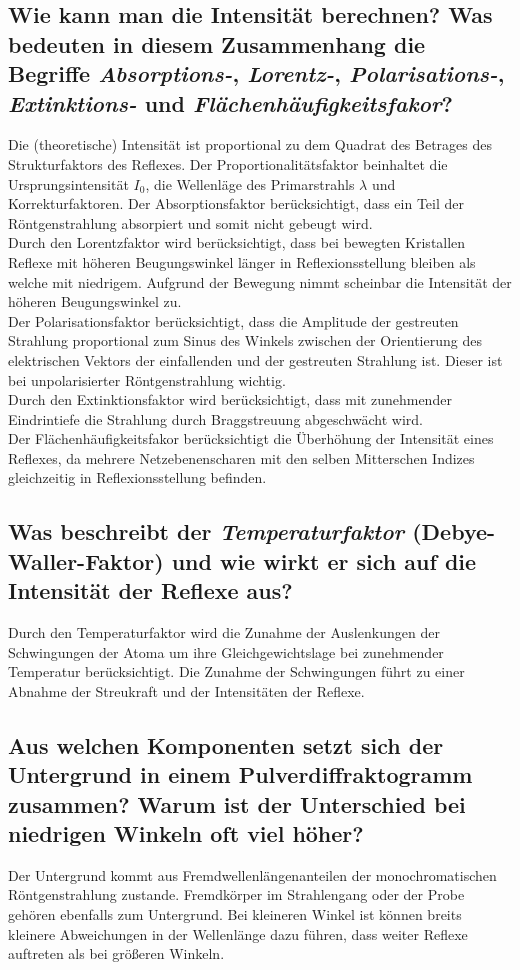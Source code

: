 \subsection*{Wie kann man die Intensität berechnen? Was bedeuten in diesem Zusammenhang die Begriffe \textit{Absorptions-}, \textit{Lorentz-}, \textit{Polarisations-}, \textit{Extinktions-} und \textit{Flächenhäufigkeitsfakor}?}
Die (theoretische) Intensität ist proportional zu dem Quadrat des Betrages des Strukturfaktors des Reflexes.
Der Proportionalitätsfaktor beinhaltet die Ursprungsintensität $I_0$, die Wellenläge des Primarstrahls $\lambda$ und Korrekturfaktoren. \cite{Kleber}
Der Absorptionsfaktor berücksichtigt, dass ein Teil der Röntgenstrahlung absorpiert und somit nicht gebeugt wird.\\
Durch den Lorentzfaktor wird berücksichtigt, dass bei bewegten Kristallen Reflexe mit höheren Beugungswinkel länger in Reflexionsstellung bleiben als welche mit niedrigem.
Aufgrund der Bewegung nimmt scheinbar die Intensität der höheren Beugungswinkel zu.\\
Der Polarisationsfaktor berücksichtigt, dass die Amplitude der gestreuten Strahlung proportional zum Sinus des Winkels zwischen der Orientierung des elektrischen Vektors der einfallenden und der gestreuten Strahlung ist.
Dieser ist bei unpolarisierter Röntgenstrahlung wichtig.\\
Durch den Extinktionsfaktor wird berücksichtigt, dass mit zunehmender Eindrintiefe die Strahlung durch Braggstreuung abgeschwächt wird.\\
Der Flächenhäufigkeitsfakor berücksichtigt die Überhöhung der Intensität eines Reflexes, da mehrere Netzebenenscharen mit den selben Mitterschen Indizes gleichzeitig in Reflexionsstellung befinden. \cite{Kleber} 
\subsection*{Was beschreibt der \textit{Temperaturfaktor} (Debye-Waller-Faktor) und wie wirkt er sich auf die Intensität der Reflexe aus?}
Durch den Temperaturfaktor wird die Zunahme der Auslenkungen der Schwingungen der Atoma um ihre Gleichgewichtslage bei zunehmender Temperatur berücksichtigt.
Die Zunahme der Schwingungen führt zu einer Abnahme der Streukraft und der Intensitäten der Reflexe.
\subsection*{Aus welchen Komponenten setzt sich der Untergrund in einem Pulverdiffraktogramm zusammen? Warum ist der Unterschied bei niedrigen Winkeln oft viel höher?}
Der Untergrund kommt aus Fremdwellenlängenanteilen der monochromatischen Röntgenstrahlung zustande.
Fremdkörper im Strahlengang oder der Probe gehören ebenfalls zum Untergrund.
Bei kleineren Winkel ist können breits kleinere Abweichungen in der Wellenlänge dazu führen, dass weiter Reflexe auftreten als bei größeren Winkeln.